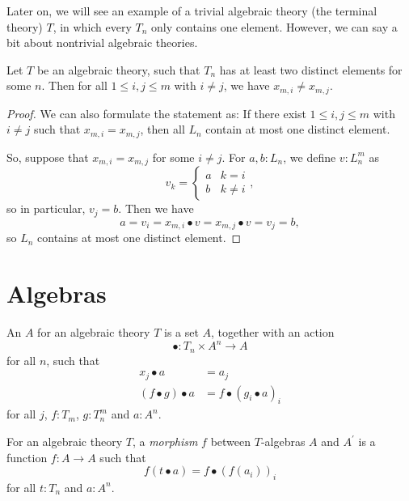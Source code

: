 Later on, we will see an example of a trivial algebraic theory (the terminal theory) $ T $, in which every $ T_n $ only contains one element. However, we can say a bit about nontrivial algebraic theories.
\begin{lemma}\label{lem:nontrivial-algebraic-theory}
  Let $ T $ be an algebraic theory, such that $ T_n $ has at least two distinct elements for some $ n $. Then for all $ 1 \leq i, j \leq m $ with $ i \not = j $, we have $ x_{m, i} \not = x_{m, j} $.
\end{lemma}
\begin{proof}
  We can also formulate the statement as: If there exist $ 1 \leq i, j \leq m $ with $ i \not = j $ such that $ x_{m, i} = x_{m, j} $, then all $ L_n $ contain at most one distinct element.

  So, suppose that $ x_{m, i} = x_{m, j} $ for some $ i \not = j $. For $ a, b : L_n $, we define $ v : L_n^m $ as
  \[ v_k = \left\{\begin{array}{ll} a & k = i\\ b & k \not = i \end{array}\right., \]
  so in particular, $ v_j = b $. Then we have
  \[ a = v_i = x_{m, i} \bullet v = x_{m, j} \bullet v = v_j = b, \]
  so $ L_n $ contains at most one distinct element.
\end{proof}

\section{Algebras}

\begin{definition}
  An  $ A $ for an algebraic theory $ T $ is a set $ A $, together with an action
  \[ \bullet: T_n \times A^n \to A \]
  for all $ n $, such that
  \begin{align*}
    x_j \bullet a &= a_j\\
    (f \bullet g) \bullet a &= f \bullet (g_i \bullet a)_i
  \end{align*}
  for all $ j $, $ f: T_m $, $ g: T_n^m $ and $ a: A^n $.
\end{definition}

\begin{definition}
  For an algebraic theory $ T $, a \textit{morphism} $ f $ between $ T $-algebras $ A $ and $ A^\prime $ is a function $ f: A \to A $ such that
  \[ f(t \bullet a) = f \bullet (f(a_i))_i \]
  for all $ t: T_n $ and $ a: A^n $.
\end{definition}

